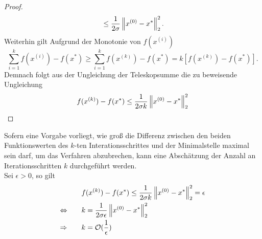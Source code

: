 \begin{proof}
\begin{gather*}
\begin{aligned}
                  & \leq \frac{1}{2\sigma} \left\lVert x^{(0)}-x^\ast\right\rVert^2_2 \text{.}\\
          			\end{aligned}
        	\end{gather*}
        Weiterhin gilt Aufgrund der Monotonie von $f(x^{(i)})$
        \begin{equation*}
          \sum_{i=1}^k f(x^{(i)})-f(x^\ast) \geq \sum_{i=1}^k f(x^{(k)})-f(x^\ast) = k \left[ f(x^{(k)})-f(x^\ast) \right] \text{.}
        \end{equation*}
        Demnach folgt aus der Ungleichung der Teleskopsumme die zu beweisende Ungleichung
        \begin{equation*}
          f(x^{(k)})-f(x^\ast) \leq \frac{1}{2\sigma k} \left\lVert x^{(0)}-x^\ast\right\rVert^2_2
        \end{equation*}
\end{proof}
\noindent
Sofern eine Vorgabe vorliegt, wie groß die Differenz zwischen den beiden Funktionswerten des $k$-ten Interationsschrittes und der Minimalstelle maximal sein darf, um das Verfahren abzubrechen, kann eine Abschätzung der Anzahl an Iterationsschritten $k$ durchgeführt werden. \\
Sei $\epsilon > 0$, so gilt
\begin{gather*}
        \begin{aligned}
          & f(x^{(k)})-f(x^\ast)  \leq \frac{1}{2\sigma k} \left\lVert x^{(0)}-x^\ast\right\rVert^2_2  = \epsilon\\
          \Leftrightarrow \qquad & k  = \frac{1}{2\sigma \epsilon} \left\lVert x^{(0)}-x^\ast\right\rVert^2_2 \\
          \Rightarrow \qquad & k = \mathcal{O}(\frac{1}{\epsilon})\\
        \end{aligned}
  \end{gather*}

